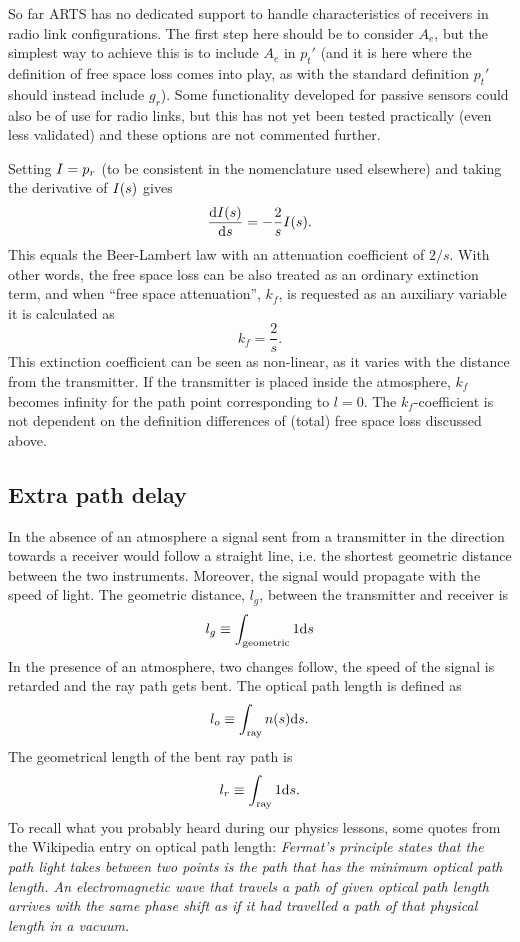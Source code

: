 So far ARTS has no dedicated support to handle characteristics of receivers in
radio link configurations. The first step here should be to consider $A_e$, but
the simplest way to achieve this is to include $A_e$ in $p_t'$ (and it is here
where the definition of free space loss comes into play, as with the standard
definition $p_t'$ should instead include $g_r$). Some functionality developed
for passive sensors could also be of use for radio links, but this has not yet
been tested practically (even less validated) and these options are not
commented further.

Setting $I=p_r$ (to be consistent in the nomenclature used elsewhere) and
taking the derivative of \(I(s)\) gives
\begin{equation}
\label{eq:fsplarts}
 \frac{\mathrm{d}I(s)}{\mathrm{d} s}=-\frac{2}{s}I(s).
\end{equation}
This equals the Beer-Lambert law with an attenuation coefficient of $2/s$. With
other words, the free space loss can be also treated as an ordinary extinction
term, and when ``free space attenuation'', $k_f$, is requested as an auxiliary
variable it is calculated as
\begin{equation}
 k_f=\frac{2}{s}.
\end{equation}
This extinction coefficient can be seen as non-linear, as it varies with the
distance from the transmitter. If the transmitter is placed inside the
atmosphere, $k_f$ becomes infinity for the path point corresponding to $l=0$.
The $k_f$-coefficient is not dependent on the definition differences of (total)
free space loss discussed above.


\subsection{Extra path delay}
%
In the absence of an atmosphere a signal sent from a transmitter in the
direction towards a receiver would follow a straight line, i.e. the shortest
geometric distance between the two instruments. Moreover, the signal would
propagate with the speed of light. The geometric distance, $l_g$, between the
transmitter and receiver is
\begin{equation}
l_g\equiv\int_{\mathrm{geometric}}1\mathrm{d} s
\end{equation}
In the presence of an atmosphere, two changes follow,
the speed of the signal is retarded and the ray path gets 
bent. The optical path length is defined as
\begin{equation}
l_o\equiv\int_{\mathrm{ray}}n(s)\mathrm{d} s.
\end{equation}
The geometrical length of the bent ray path is
\begin{equation}
l_r\equiv\int_{\mathrm{ray}}1\mathrm{d} s.
\label{eq:rlink:lr}
\end{equation}
To recall what you probably heard during our physics lessons, some quotes from
the Wikipedia entry on optical path length: \emph{Fermat's principle states
  that the path light takes between two points is the path that has the minimum
  optical path length. An electromagnetic wave that travels a path of given
  optical path length arrives with the same phase shift as if it had travelled
  a path of that physical length in a vacuum.}

